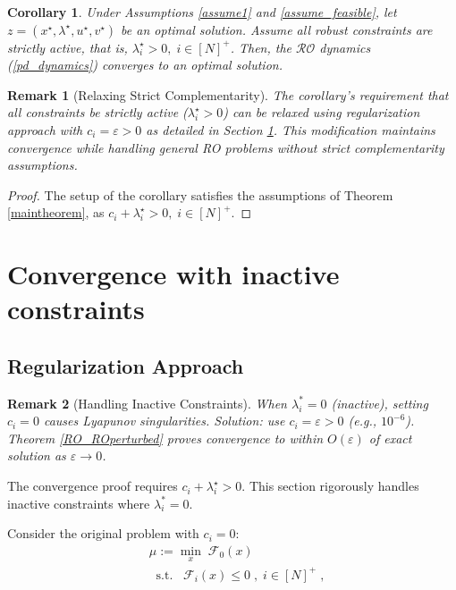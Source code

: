 \documentclass[journal,twoside,web]{ieeecolor}
\newcommand{\rev}[1]{\textcolor{revisionblue}{#1}}
\newtheorem{corollary}{Corollary}
\newtheorem{remark}{Remark}
\begin{document}
\begin{corollary}
Under Assumptions \ref{assume1} and \ref{assume_feasible}, let $z=(x^\star,\lambda^\star,u^\star,v^\star)$ be an optimal solution.
Assume all robust constraints are strictly active, that is, $\lambda_i^\star>0,\;i\in[N]^+$. Then, the $\mathcal{RO}$ dynamics (\ref{pd_dynamics}) converges to an optimal solution.
\end{corollary}

\begin{remark}[\rev{Relaxing Strict Complementarity}]
\rev{The corollary's requirement that all constraints be strictly active ($\lambda_i^\star > 0$) can be relaxed using 
regularization approach with $c_i = \varepsilon > 0$ as detailed in Section \ref{perturbed_section_pddynamics}. This modification maintains convergence while handling general RO problems without strict complementarity assumptions.}
\end{remark}
\begin{proof}
The setup of the corollary satisfies the assumptions of Theorem \ref{maintheorem}, as $c_i+\lambda_i^\star>0,\;i\in[N]^+$.
\end{proof}


\section{Convergence with inactive constraints} \label{perturbed_section_pddynamics}

\subsection*{\rev{Regularization Approach}}

\begin{remark}[\rev{Handling Inactive Constraints}]
\rev{When $\lambda_i^* = 0$ (inactive), setting $c_i = 0$ causes Lyapunov singularities. Solution: use $c_i = \varepsilon > 0$ (e.g., $10^{-6}$). Theorem \ref{RO_ROperturbed} proves convergence to within $O(\varepsilon)$ of exact solution as $\varepsilon \to 0$.}
\end{remark}

The convergence proof requires $c_i+\lambda_i^\star>0$. This section rigorously handles inactive constraints where $\lambda_i^* = 0$.

Consider the original problem with $c_i=0$:
\begin{align} \label{mu_0}
&\mu:=\underset{x}{\min} \; \mathcal{F}_0(x)\\
&\;\;\text{s.t.}\;\;\;\mathcal{F}_i(x)\leq 0\;,\;i\in[N]^+\;,\nonumber
\end{align}
\end{document}
